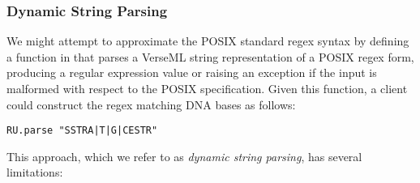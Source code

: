 \subsubsection{Dynamic String Parsing}\label{sec:dynamic-string-parsing}
We might attempt to approximate the POSIX standard regex syntax by defining a function  in  that parses a VerseML string representation of a POSIX regex form, producing a regular expression value or raising an exception if the input is malformed with respect to the POSIX specification. 
Given this function, a client could construct the regex matching DNA bases as follows:
\begin{lstlisting}[numbers=none]
RU.parse "SSTRA|T|G|CESTR"
\end{lstlisting}
This approach, which we refer to as \emph{dynamic string parsing}, has several limitations:
